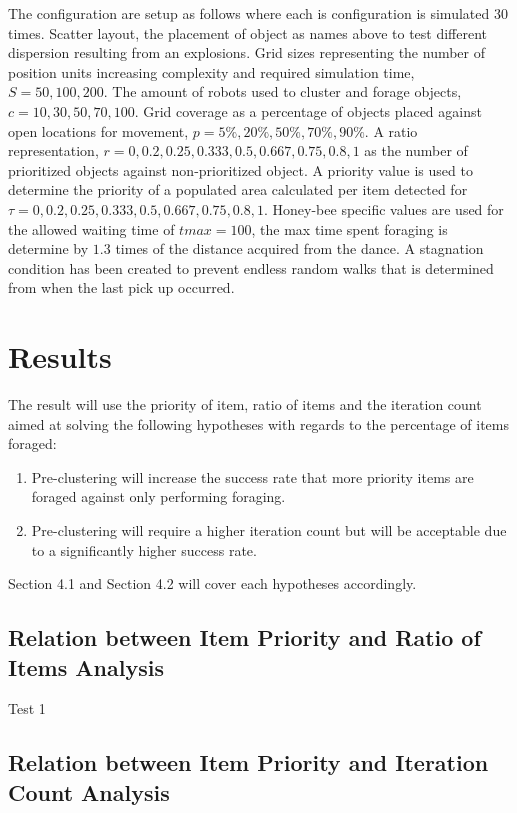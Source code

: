 \documentclass[12pt]{article}
\begin{document}
\par{The configuration are setup as follows where each is configuration is simulated 30 times. Scatter layout, the placement of object as names above to test different dispersion resulting from an explosions. Grid sizes representing the number of position units increasing complexity and required simulation time, $S = 50, 100, 200$. The amount of robots used to cluster and forage objects, $c = 10, 30, 50, 70, 100$. Grid coverage as a percentage of objects placed against open locations for movement, $p = 5\%, 20\%, 50\%, 70\%, 90\%$. A ratio representation, $r = 0, 0.2, 0.25, 0.333, 0.5, 0.667, 0.75, 0.8, 1$ as the number of prioritized objects against non-prioritized object. A priority value is used to determine the priority of a populated area calculated per item detected for $\tau = 0, 0.2, 0.25, 0.333, 0.5, 0.667, 0.75, 0.8, 1$. Honey-bee specific values are used for the allowed waiting time of $tmax = 100$, the max time spent foraging is determine by $1.3$ times of the distance acquired from the dance. A stagnation condition has been created to prevent endless random walks that is determined from when the last pick up occurred.}

\section*{Results}

The result will use the priority of item, ratio of items and the iteration count aimed at solving the following hypotheses with regards to the percentage of items foraged: 
\begin{enumerate}[nolistsep]
	\item Pre-clustering will increase the success rate that more priority items are foraged against only performing foraging.
	\item Pre-clustering will require a higher iteration count but will be acceptable due to a significantly higher success rate.
\end{enumerate}
Section 4.1 and Section 4.2 will cover each hypotheses accordingly.

\subsection{Relation between Item Priority and Ratio of Items Analysis}

\par{Test 1}

\subsection{Relation between Item Priority and Iteration Count Analysis}
\end{document}

